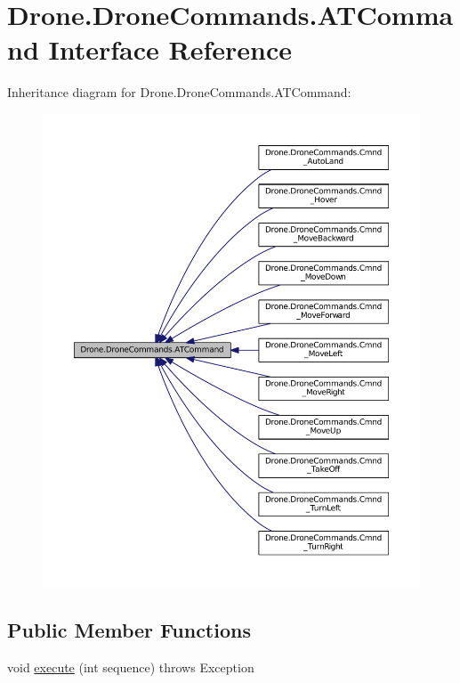 \hypertarget{interface_drone_1_1_drone_commands_1_1_a_t_command}{}\section{Drone.\+Drone\+Commands.\+A\+T\+Command Interface Reference}
\label{interface_drone_1_1_drone_commands_1_1_a_t_command}


Inheritance diagram for Drone.\+Drone\+Commands.\+A\+T\+Command\+:\nopagebreak
\begin{figure}[H]
\begin{center}
\leavevmode
\includegraphics[width=350pt]{interface_drone_1_1_drone_commands_1_1_a_t_command__inherit__graph}
\end{center}
\end{figure}
\subsection*{Public Member Functions}
\begin{DoxyCompactItemize}
\item 
void \hyperlink{interface_drone_1_1_drone_commands_1_1_a_t_command_a5205ae7a2269e1a82923c166322e1374}{execute} (int sequence)  throws Exception
\end{DoxyCompactItemize}


